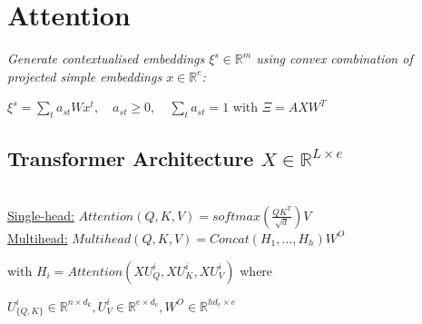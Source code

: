 \section*{Attention}
\color{black}
\textit{Generate contextualised embeddings $\xi^s \in \mathbb{R}^m$ using convex combination of projected simple embeddings $x \in \mathbb{R}^e$:}

\hspace{3pt} $\xi^s = \sum_t a_{st} W x^t, \quad a_{st} \geq 0, \quad \sum_t a_{st} = 1$ with $\Xi = AXW^T$\\ 

\subsection*{Transformer Architecture \hfill $X \in \mathbb{R}^{L \times e}$}
\\
\underline{Single-head:} $Attention(Q, K, V) = softmax(\tfrac{QK^T}{\sqrt{d}}) V$\\
\underline{Multihead:} $Multihead(Q,K,V) = Concat(H_1, \dots, H_h)W^O$

\hfill with $H_i= Attention(XU_Q^i, XU_K^i, X U_V^i)$ where

\hfill ${U_{\{Q,K\}}^i} \in \mathbb{R}^{n\times d_k}, U_V^i \in \mathbb{R}^{e \times d_v}, W^O \in \mathbb{R}^{hd_v\times e}$

